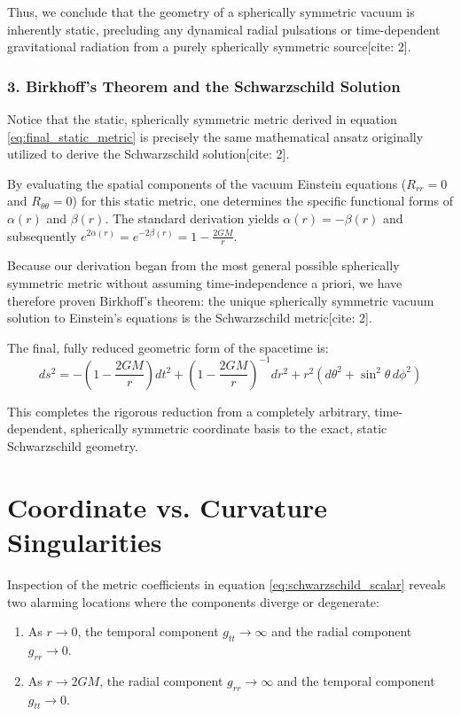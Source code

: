 \documentclass[11pt, a4paper]{report}
\begin{document}
Thus, we conclude that the geometry of a spherically symmetric vacuum is inherently static, precluding any dynamical radial pulsations or time-dependent gravitational radiation from a purely spherically symmetric source[cite: 2].

\subsubsection*{3. Birkhoff's Theorem and the Schwarzschild Solution}

Notice that the static, spherically symmetric metric derived in equation \eqref{eq:final_static_metric} is precisely the same mathematical ansatz originally utilized to derive the Schwarzschild solution[cite: 2]. 

By evaluating the spatial components of the vacuum Einstein equations ($R_{rr} = 0$ and $R_{\theta\theta} = 0$) for this static metric, one determines the specific functional forms of $\alpha(r)$ and $\beta(r)$. The standard derivation yields $\alpha(r) = -\beta(r)$ and subsequently $e^{2\alpha(r)} = e^{-2\beta(r)} = 1 - \frac{2GM}{r}$. 

Because our derivation began from the most general possible spherically symmetric metric without assuming time-independence a priori, we have therefore proven Birkhoff's theorem: the unique spherically symmetric vacuum solution to Einstein's equations is the Schwarzschild metric[cite: 2]. 

The final, fully reduced geometric form of the spacetime is:
\begin{equation}
    ds^2 = -\left(1-\frac{2GM}{r}\right) dt^2 + \left(1-\frac{2GM}{r}\right)^{-1} dr^2 + r^2 \left( d\theta^2 + \sin^2\theta \, d\phi^2 \right) \label{eq:schwarzschild_metric}
\end{equation}

This completes the rigorous reduction from a completely arbitrary, time-dependent, spherically symmetric coordinate basis to the exact, static Schwarzschild geometry.


\section{Coordinate vs. Curvature Singularities}

Inspection of the metric coefficients in equation \eqref{eq:schwarzschild_scalar} reveals two alarming locations where the components diverge or degenerate:
\begin{enumerate}
    \item As $r \to 0$, the temporal component $g_{tt} \to \infty$ and the radial component $g_{rr} \to 0$.
    \item As $r \to 2GM$, the radial component $g_{rr} \to \infty$ and the temporal component $g_{tt} \to 0$.
\end{enumerate}
\end{document}
